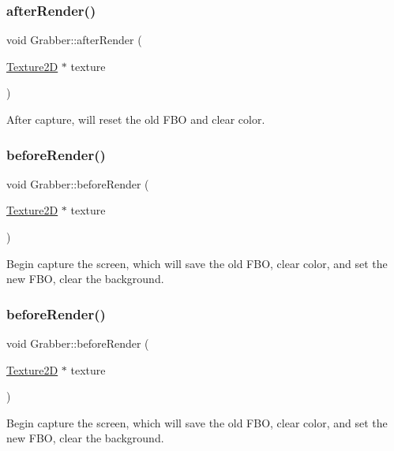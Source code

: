 \subsubsection{\texorpdfstring{after\+Render()}{afterRender()}\hspace{0.1cm}{\footnotesize\ttfamily [2/2]}}
{\footnotesize\ttfamily void Grabber\+::after\+Render (\begin{DoxyParamCaption}\item[{\hyperlink{classTexture2D}{Texture2D} $\ast$}]{texture }\end{DoxyParamCaption})}

After capture, will reset the old F\+BO and clear color. \mbox{\label{classGrabber_ab4eaa7f3482cf2a1e845da657ea875bb}} 
\subsubsection{\texorpdfstring{before\+Render()}{beforeRender()}\hspace{0.1cm}{\footnotesize\ttfamily [1/2]}}
{\footnotesize\ttfamily void Grabber\+::before\+Render (\begin{DoxyParamCaption}\item[{\hyperlink{classTexture2D}{Texture2D} $\ast$}]{texture }\end{DoxyParamCaption})}

Begin capture the screen, which will save the old F\+BO, clear color, and set the new F\+BO, clear the background. \mbox{\label{classGrabber_ab4eaa7f3482cf2a1e845da657ea875bb}} 
\subsubsection{\texorpdfstring{before\+Render()}{beforeRender()}\hspace{0.1cm}{\footnotesize\ttfamily [2/2]}}
{\footnotesize\ttfamily void Grabber\+::before\+Render (\begin{DoxyParamCaption}\item[{\hyperlink{classTexture2D}{Texture2D} $\ast$}]{texture }\end{DoxyParamCaption})}

Begin capture the screen, which will save the old F\+BO, clear color, and set the new F\+BO, clear the background. \mbox{\label{classGrabber_abca4258ce3080009f5ed06d30ea913f7}} 
